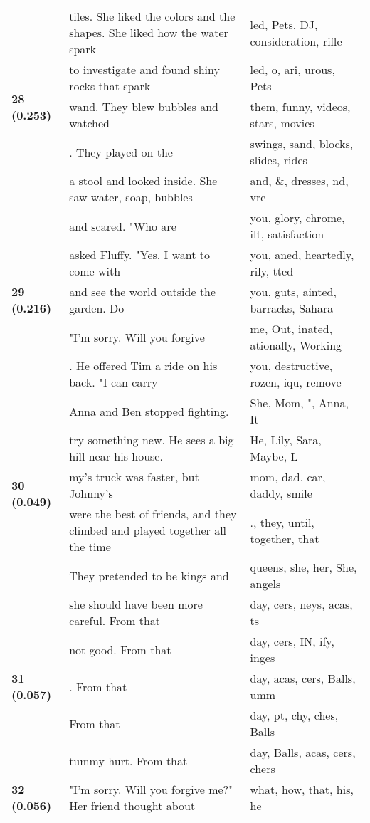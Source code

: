 \documentclass{article}
\begin{document}
\begin{adjustbox}{max width=\textwidth}
\begin{tabular}{p{} p{} p{}}
\midrule
\multirow{5}{*}{\textbf{28 (0.253)}} & tiles. She liked the colors and the shapes. She liked how the water spark & led,  Pets,  DJ,  consideration,  rifle \\
 & to investigate and found shiny rocks that spark & led, o, ari, urous,  Pets \\
 & wand. They blew bubbles and watched & them,  funny,  videos,  stars,  movies \\
 & . They played on the & swings,  sand,  blocks,  slides,  rides \\
 & a stool and looked inside. She saw water, soap, bubbles & and,  \&,  dresses, nd, vre \\
\midrule
\multirow{5}{*}{\textbf{29 (0.216)}} & and scared.  "Who are & you,  glory,  chrome, ilt,  satisfaction \\
 & asked Fluffy. "Yes, I want to come with & you, aned, heartedly, rily, tted \\
 & and see the world outside the garden. Do & you,  guts, ainted,  barracks,  Sahara \\
 & "I'm sorry. Will you forgive & me, Out, inated, ationally, Working \\
 & . He offered Tim a ride on his back. "I can carry & you,  destructive, rozen, iqu, remove \\
\midrule
\multirow{5}{*}{\textbf{30 (0.049)}} & Anna and Ben stopped fighting. & She,  Mom,  ",  Anna,  It \\
 & try something new. He sees a big hill near his house. & He,  Lily,  Sara,  Maybe,  L \\
 & my's truck was faster, but Johnny's & mom,  dad,  car,  daddy,  smile \\
 & were the best of friends, and they climbed and played together all the time & .,  they,  until,  together,  that \\
 & They pretended to be kings and & queens,  she,  her,  She,  angels \\
\midrule
\multirow{5}{*}{\textbf{31 (0.057)}} & she should have been more careful. From that & day, cers, neys, acas, ts \\
 & not good. From that & day, cers, IN, ify, inges \\
 & . From that & day, acas, cers,  Balls, umm \\
 & From that & day, pt, chy, ches,  Balls \\
 & tummy hurt. From that & day,  Balls, acas, cers, chers \\
\midrule
\multirow{5}{*}{\textbf{32 (0.056)}} & "I'm sorry. Will you forgive me?" Her friend thought about & what,  how,  that,  his,  he \\

\end{tabular}
\end{adjustbox}
\end{document}
